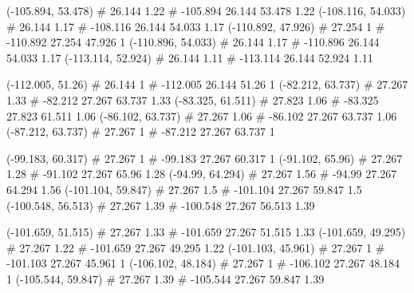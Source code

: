 \documentclass[a4paper,openbib,10pt]{article}
\newenvironment{treegraph}{\begin{graph}}{\end{graph}}
\begin{document}
\begin{treegraph}
  (-105.894, 53.478) #     26.144    1.22
   #    -105.894    26.144    53.478    1.22
  (-108.116, 54.033) #     26.144    1.17
   #    -108.116    26.144    54.033    1.17
  (-110.892, 47.926) #     27.254    1
   #    -110.892    27.254    47.926    1
  (-110.896, 54.033) #     26.144    1.17
   #    -110.896    26.144    54.033    1.17
  (-113.114, 52.924) #     26.144    1.11
   #    -113.114    26.144    52.924    1.11

  (-112.005, 51.26) #     26.144    1
   #    -112.005    26.144    51.26    1
  (-82.212, 63.737) #     27.267    1.33
   #    -82.212    27.267    63.737    1.33
  (-83.325, 61.511) #     27.823    1.06
   #    -83.325    27.823    61.511    1.06
  (-86.102, 63.737) #     27.267    1.06
   #    -86.102    27.267    63.737    1.06
  (-87.212, 63.737) #     27.267    1
   #    -87.212    27.267    63.737    1

  (-99.183, 60.317) #     27.267    1
   #    -99.183    27.267    60.317    1
  (-91.102, 65.96) #     27.267    1.28
   #    -91.102    27.267    65.96    1.28
  (-94.99, 64.294) #     27.267    1.56
   #    -94.99    27.267    64.294    1.56
  (-101.104, 59.847) #     27.267    1.5
   #    -101.104    27.267    59.847    1.5
  (-100.548, 56.513) #     27.267    1.39
   #    -100.548    27.267    56.513    1.39

  (-101.659, 51.515) #     27.267    1.33
   #    -101.659    27.267    51.515    1.33
  (-101.659, 49.295) #     27.267    1.22
   #    -101.659    27.267    49.295    1.22
  (-101.103, 45.961) #     27.267    1
   #    -101.103    27.267    45.961    1
  (-106.102, 48.184) #     27.267    1
   #    -106.102    27.267    48.184    1
  (-105.544, 59.847) #     27.267    1.39
   #    -105.544    27.267    59.847    1.39


\end{treegraph}
\end{document}
